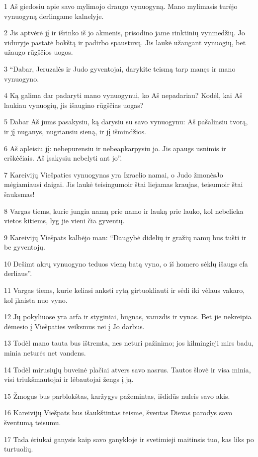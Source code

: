 \par 1 Aš giedosiu apie savo mylimojo draugo vynuogyną. Mano mylimasis turėjo vynuogyną derlingame kalnelyje. 
\par 2 Jis aptvėrė jį ir išrinko iš jo akmenis, prisodino jame rinktinių vynmedžių. Jo viduryje pastatė bokštą ir padirbo spaustuvą. Jis laukė užaugant vynuogių, bet užaugo rūgščios uogos. 
\par 3 “Dabar, Jeruzalės ir Judo gyventojai, darykite teismą tarp manęs ir mano vynuogyno. 
\par 4 Ką galima dar padaryti mano vynuogynui, ko Aš nepadariau? Kodėl, kai Aš laukiau vynuogių, jis išaugino rūgščias uogas? 
\par 5 Dabar Aš jums pasakysiu, ką darysiu su savo vynuogynu: Aš pašalinsiu tvorą, ir jį nuganys, nugriausiu sieną, ir jį išmindžios. 
\par 6 Aš apleisiu jį: nebepurensiu ir nebeapkarpysiu jo. Jis apaugs usnimis ir erškėčiais. Aš įsakysiu nebelyti ant jo”. 
\par 7 Kareivijų Viešpaties vynuogynas yra Izraelio namai, o Judo žmonės­Jo mėgiamiausi daigai. Jis laukė teisingumo­ir štai liejamas kraujas, teisumo­ir štai šauksmas! 
\par 8 Vargas tiems, kurie jungia namą prie namo ir lauką prie lauko, kol nebelieka vietos kitiems, lyg jie vieni čia gyventų. 
\par 9 Kareivijų Viešpats kalbėjo man: “Daugybė didelių ir gražių namų bus tušti ir be gyventojų. 
\par 10 Dešimt akrų vynuogyno teduos vieną batą vyno, o iš homero sėklų išaugs efa derliaus”. 
\par 11 Vargas tiems, kurie keliasi anksti rytą girtuokliauti ir sėdi iki vėlaus vakaro, kol įkaista nuo vyno. 
\par 12 Jų pokyliuose yra arfa ir styginiai, būgnas, vamzdis ir vynas. Bet jie nekreipia dėmesio į Viešpaties veiksmus nei į Jo darbus. 
\par 13 Todėl mano tauta bus ištremta, nes neturi pažinimo; jos kilmingieji mirs badu, minia neturės net vandens. 
\par 14 Todėl mirusiųjų buveinė plačiai atvers savo nasrus. Tautos šlovė ir visa minia, visi triukšmautojai ir lėbautojai žengs į ją. 
\par 15 Žmogus bus parblokštas, karžygys pažemintas, išdidūs nuleis savo akis. 
\par 16 Kareivijų Viešpats bus išaukštintas teisme, šventas Dievas parodys savo šventumą teisumu. 
\par 17 Tada ėriukai ganysis kaip savo ganykloje ir svetimieji maitinsis tuo, kas liks po turtuolių. 
